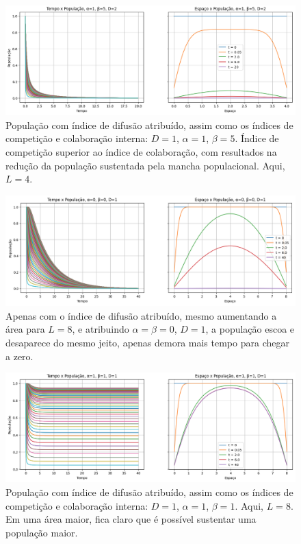 \documentclass{article}
\begin{document}
 	\begin{figure}[h]
 		\centering
 		\includegraphics[scale=0.35]{L4-alpha1-beta5-D2}
 		\caption{População com índice de difusão atribuído, assim como os índices de competição e colaboração interna: $D=1$, $\alpha=1$, $\beta=5$. Índice de competição superior ao índice de colaboração, com resultados na redução da população sustentada pela mancha populacional. Aqui, $L=4$.}
 		\label{fig:L4-alpha1-beta5-D2}
 	\end{figure}
 
 	\begin{figure}[h]
 		\centering
 		\includegraphics[scale=0.35]{L8-alpha0-beta0-D1}
 		\caption{Apenas com o índice de difusão atribuído, mesmo aumentando a área para $L=8$, e atribuindo $\alpha = \beta = 0$, $D = 1$, a população escoa e desaparece do mesmo jeito, apenas demora mais tempo para chegar a zero.}
 		\label{fig:L8-alpha0-beta0-D1}
 	\end{figure}
 
 	\begin{figure}[h]
 		\centering
 		\includegraphics[scale=0.35]{L8-alpha1-beta1-D1}
 		\caption{População com índice de difusão atribuído, assim como os índices de competição e colaboração interna: $D=1$, $\alpha=1$, $\beta=1$. Aqui, $L=8$. Em uma área maior, fica claro que é possível sustentar uma população maior.}
 		\label{fig:L8-alpha1-beta1-D1}
 	\end{figure}
 
\end{document}
